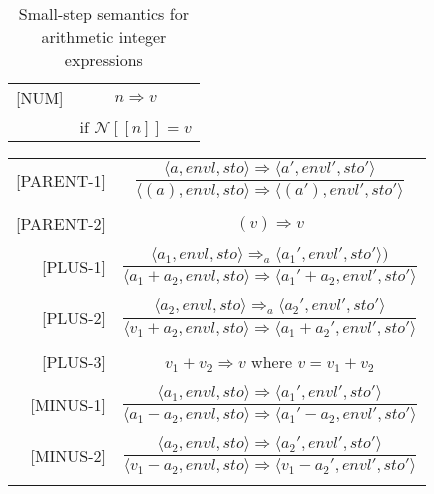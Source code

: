 \begin{table}[H]
    \centering
    \begin{longtable}[c] { r c }
        
        [NUM] & \( n \Rightarrow v \) 
         \\ \\
        & 
       \( \text{if } \mathcal{N} [[n]] = v \) \\
        
    \end{longtable}
    \caption{Small-step semantics for arithmetic integer expressions}
\end{table}

\begin{longtable}[c] { r c }
  \centering

  [PARENT-1] & 
    \( \dfrac { \langle a, envl, sto \rangle \Rightarrow \langle a', envl', sto' \rangle }
      { \langle (a), envl, sto \rangle  \Rightarrow \langle (a'), envl', sto' \rangle } \) \\
  & \\

  [PARENT-2] & 
    \( (v) \Rightarrow v \) \\
  & \\

  [PLUS-1] & 
    \( \dfrac { \langle a_1, envl, sto \rangle \Rightarrow_a \langle a_1', envl', sto' \rangle )}
      {\langle a_1 + a_2, envl, sto \rangle \Rightarrow \langle a_1' + a_2, envl', sto' \rangle } \) \\
  & \\

  [PLUS-2] & 
    \( \dfrac { \langle a_2, envl, sto \rangle \Rightarrow_a \langle a_2', envl', sto' \rangle }
      {\langle v_1 + a_2, envl, sto \rangle  \Rightarrow \langle a_1 + a_2', envl', sto' \rangle } \) \\
  & \\

  [PLUS-3] & 
    \( v_1 + v_2 \Rightarrow v \) where \( v = v_1 + v_2\) \\
  & \\

  [MINUS-1] & 
    \( \dfrac { \langle a_1, envl, sto \rangle \Rightarrow \langle a_1', envl', sto' \rangle }
      {\langle a_1 - a_2, envl, sto \rangle \Rightarrow \langle a_1' - a_2, envl', sto' \rangle } \) \\
  & \\

  [MINUS-2] & 
    \( \dfrac { \langle a_2, envl, sto \rangle \Rightarrow \langle a_2', envl', sto' \rangle }
      {\langle v_1 - a_2, envl, sto \rangle \Rightarrow \langle v_1 - a_2', envl', sto' \rangle } \) \\
  & \\


\end{longtable}
